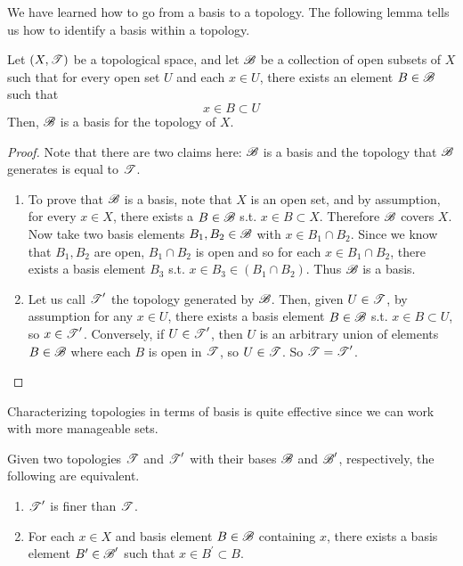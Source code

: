   We have learned how to go from a basis to a topology. The following lemma tells us how to identify a basis within a topology. 

  \begin{theorem}
    Let $(X, \operatorname{\mathscr{T}})$ be a topological space, and let $\operatorname{\mathscr{B}}$ be a collection of open subsets of $X$ such that for every open set $U$ and each $x \in U$, there exists an element $B \in \operatorname{\mathscr{B}}$ such that
    \begin{equation}
      x \in B \subset U
    \end{equation}
    Then, $\operatorname{\mathscr{B}}$ is a basis for the topology of $X$. 
  \end{theorem}
  \begin{proof}
    Note that there are two claims here: $\operatorname{\mathscr{B}}$ is a basis and the topology that $\operatorname{\mathscr{B}}$ generates is equal to $\operatorname{\mathscr{T}}$. 
    \begin{enumerate}
      \item To prove that $\operatorname{\mathscr{B}}$ is a basis, note that $X$ is an open set, and by assumption, for every $x \in X$, there exists a $B \in \operatorname{\mathscr{B}}$ s.t. $x \in B \subset X$. Therefore $\operatorname{\mathscr{B}}$ covers $X$. Now take two basis elements $B_1, B_2 \in \operatorname{\mathscr{B}}$ with $x \in B_1 \cap B_2$. Since we know that $B_1, B_2$ are open, $B_1 \cap B_2$ is open and so for each $x \in B_1 \cap B_2$, there exists a basis element $B_3$ s.t. $x \in B_3 \in (B_1 \cap B_2)$. Thus $\operatorname{\mathscr{B}}$ is a basis. 

      \item Let us call $\operatorname{\mathscr{T}}^\prime$ the topology generated by $\operatorname{\mathscr{B}}$. Then, given $U \in \operatorname{\mathscr{T}}$, by assumption for any $x \in U$, there exists a basis element $B \in \operatorname{\mathscr{B}}$ s.t. $x \in B \subset U$, so $x \in \operatorname{\mathscr{T}}^\prime$. Conversely, if $U \in \operatorname{\mathscr{T}}^\prime$, then $U$ is an arbitrary union of elements $B \in \operatorname{\mathscr{B}}$ where each $B$ is open in $\operatorname{\mathscr{T}}$, so $U \in \operatorname{\mathscr{T}}$. So $\operatorname{\mathscr{T}} = \operatorname{\mathscr{T}}^\prime$. 
    \end{enumerate}
  \end{proof} 

  Characterizing topologies in terms of basis is quite effective since we can work with more manageable sets. 

  \begin{lemma}
    Given two topologies $\operatorname{\mathscr{T}}$ and $\operatorname{\mathscr{T}}^\prime$ with their bases $\operatorname{\mathscr{B}}$ and $\operatorname{\mathscr{B}}^\prime$, respectively, the following are equivalent. 
    \begin{enumerate}
      \item $\operatorname{\mathscr{T}}^\prime$ is finer than $\operatorname{\mathscr{T}}$. 
      \item For each $x \in X$ and basis element $B \in \operatorname{\mathscr{B}}$ containing $x$, there exists a basis element $B^\prime \in \operatorname{\mathscr{B}}^\prime$ such that $x \in B^\prime \subset B$. 
    \end{enumerate}
  \end{lemma}


